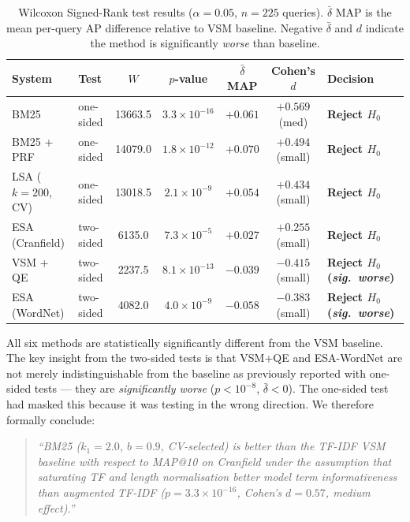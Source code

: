 \documentclass{article}
\begin{document}
\begin{table}[H]
\centering
\renewcommand{\arraystretch}{1.3}
\begin{tabular}{llccccl}
\toprule
\textbf{System} & \textbf{Test} & \textbf{$W$} & \textbf{$p$-value} & \textbf{$\bar{\delta}$ MAP} & \textbf{Cohen's $d$} & \textbf{Decision} \\
\midrule
BM25           & one-sided & 13663.5 & $3.3 \times 10^{-16}$ & $+0.061$ & $+0.569$ (med) & \textbf{Reject $H_0$} \\
BM25 + PRF     & one-sided & 14079.0 & $1.8 \times 10^{-12}$ & $+0.070$ & $+0.494$ (small) & \textbf{Reject $H_0$} \\
LSA ($k{=}200$, CV) & one-sided & 13018.5 & $2.1 \times 10^{-9}$  & $+0.054$ & $+0.434$ (small) & \textbf{Reject $H_0$} \\
ESA (Cranfield)& two-sided & 6135.0  & $7.3 \times 10^{-5}$  & $+0.027$ & $+0.255$ (small) & \textbf{Reject $H_0$} \\
VSM + QE       & two-sided & 2237.5  & $8.1 \times 10^{-13}$ & $-0.039$ & $-0.415$ (small) & \textbf{Reject $H_0$ (\emph{sig.\ worse})} \\
ESA (WordNet)  & two-sided & 4082.0  & $4.0 \times 10^{-9}$  & $-0.058$ & $-0.383$ (small) & \textbf{Reject $H_0$ (\emph{sig.\ worse})} \\
\bottomrule
\end{tabular}
\caption{Wilcoxon Signed-Rank test results ($\alpha = 0.05$, $n{=}225$ queries). $\bar{\delta}$ MAP is the mean per-query AP difference relative to VSM baseline. Negative $\bar{\delta}$ and $d$ indicate the method is significantly \emph{worse} than baseline.}
\label{tab:wilcoxon}
\end{table}

All six methods are statistically significantly different from the VSM baseline. The key insight from the two-sided tests is that VSM+QE and ESA-WordNet are not merely indistinguishable from the baseline as previously reported with one-sided tests --- they are \emph{significantly worse} ($p < 10^{-8}$, $\bar{\delta} < 0$). The one-sided test had masked this because it was testing in the wrong direction. We therefore formally conclude:

\begin{quote}
\textit{``BM25 ($k_1{=}2.0$, $b{=}0.9$, CV-selected) is better than the TF-IDF VSM baseline with respect to MAP@10 on Cranfield under the assumption that saturating TF and length normalisation better model term informativeness than augmented TF-IDF ($p = 3.3 \times 10^{-16}$, Cohen's $d = 0.57$, medium effect).''}
\end{quote}
\end{document}
